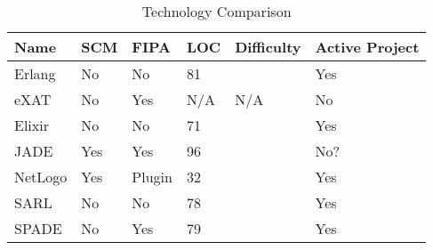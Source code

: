 \begin{table}[h]
    \centering
    \caption{Technology Comparison}\label{tab:tech_comparison}
    \begin{tabular}{@{}llllll@{}}
        \toprule
        Name & SCM & FIPA & LOC & Difficulty & Active Project\\
        \midrule
        Erlang & No & No & 81 &  & Yes\\
        eXAT & No & Yes & N/A & N/A & No\\
        Elixir & No & No & 71 &  & Yes\\
        JADE & Yes & Yes & 96 &  & No?\\
        NetLogo & Yes & Plugin & 32 &  & Yes\\
        SARL & No & No & 78 &  & Yes\\
        SPADE & No & Yes & 79 &  & Yes\\
        \bottomrule
    \end{tabular}
\end{table}
